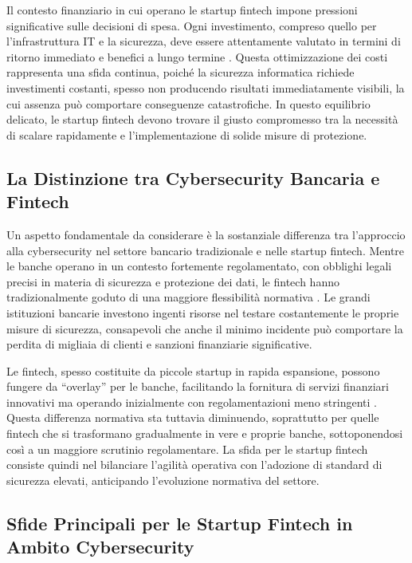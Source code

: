 \documentclass[a4paper,12pt]{report}
\begin{document}
Il contesto finanziario in cui operano le startup fintech impone pressioni significative sulle decisioni di spesa. Ogni investimento, compreso quello per l'infrastruttura IT e la sicurezza, deve essere attentamente valutato in termini di ritorno immediato e benefici a lungo termine \cite{fintechChallenges}. Questa ottimizzazione dei costi rappresenta una sfida continua, poiché la sicurezza informatica richiede investimenti costanti, spesso non producendo risultati immediatamente visibili, la cui assenza può comportare conseguenze catastrofiche. In questo equilibrio delicato, le startup fintech devono trovare il giusto compromesso tra la necessità di scalare rapidamente e l'implementazione di solide misure di protezione.

\subsection{La Distinzione tra Cybersecurity Bancaria e Fintech}

Un aspetto fondamentale da considerare è la sostanziale differenza tra l'approccio alla cybersecurity nel settore bancario tradizionale e nelle startup fintech. Mentre le banche operano in un contesto fortemente regolamentato, con obblighi legali precisi in materia di sicurezza e protezione dei dati, le fintech hanno tradizionalmente goduto di una maggiore flessibilità normativa \cite{bankingVsFintech}. Le grandi istituzioni bancarie investono ingenti risorse nel testare costantemente le proprie misure di sicurezza, consapevoli che anche il minimo incidente può comportare la perdita di migliaia di clienti e sanzioni finanziarie significative.

Le fintech, spesso costituite da piccole startup in rapida espansione, possono fungere da “overlay” per le banche, facilitando la fornitura di servizi finanziari innovativi ma operando inizialmente con regolamentazioni meno stringenti \cite{bankingVsFintech}. Questa differenza normativa sta tuttavia diminuendo, soprattutto per quelle fintech che si trasformano gradualmente in vere e proprie banche, sottoponendosi così a un maggiore scrutinio regolamentare. La sfida per le startup fintech consiste quindi nel bilanciare l'agilità operativa con l'adozione di standard di sicurezza elevati, anticipando l'evoluzione normativa del settore.

\subsection{Sfide Principali per le Startup Fintech in Ambito Cybersecurity}
\end{document}
